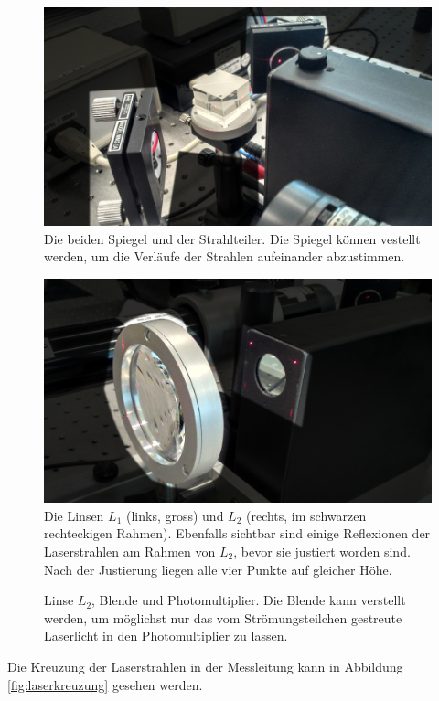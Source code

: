 \begin{figure}[h!t]
    \centering
    \includegraphics[width=.67\textwidth]{images/spiegel.jpeg}
    \caption{%
        Die beiden Spiegel und der Strahlteiler. Die Spiegel k\"onnen vestellt
        werden, um die Verl\"aufe der Strahlen aufeinander abzustimmen.
    }
    \label{fig:spiegel}
\end{figure}


\begin{figure}[h!t]
    \centering
    \includegraphics[width=.67\textwidth]{images/linse.jpeg}
    \caption{%
        Die  Linsen  $L_1$ (links,  gross)  und  $L_2$ (rechts,  im  schwarzen
        rechteckigen  Rahmen). Ebenfalls  sichtbar   sind  einige  Reflexionen
        der  Laserstrahlen am  Rahmen  von $L_2$,  bevor  sie justiert  worden
        sind. Nach der Justierung liegen alle vier Punkte auf gleicher H\"ohe.
    }
    \label{fig:lensL1}
\end{figure}

\begin{figure}[h!t]
    \centering
    \resizebox{.67\textwidth}{!}{}
    \caption{%
        Linse  $L_2$, Blende  und Photomultiplier. Die  Blende kann  verstellt
        werden,  um  m\"oglichst  nur  das  vom Str\"omungsteilchen  gestreute
        Laserlicht in den Photomultiplier zu lassen.
    }
    \label{fig:versuchsanordnung:blende}
\end{figure}

Die  Kreuzung  der   Laserstrahlen  in  der  Messleitung   kann  in  Abbildung
\ref{fig:laserkreuzung} gesehen werden.

